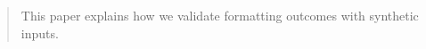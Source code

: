 \begin{abstract}
This paper explains how we validate formatting outcomes with synthetic inputs.
\end{abstract}
